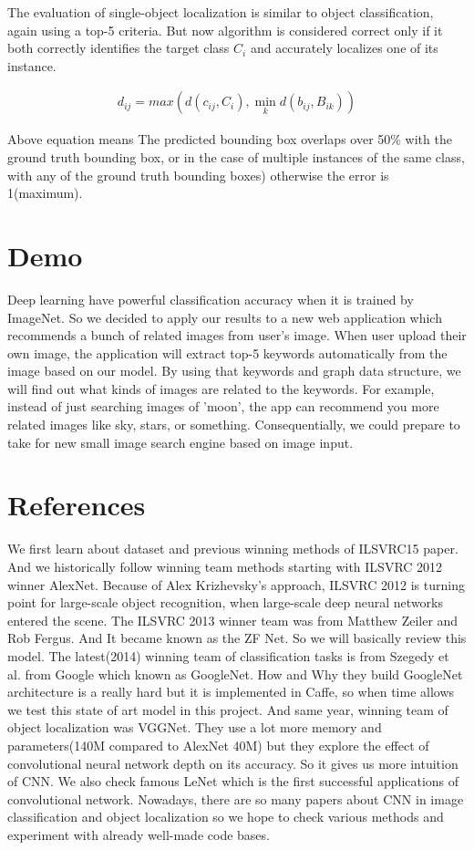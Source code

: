 \documentclass[10pt,twocolumn,letterpaper]{article}
\begin{document}
The evaluation of single-object localization is similar to object classification, again using a top-5 criteria.
But now algorithm is considered correct only if it both correctly identifies the target class $C_i$ and accurately localizes one of its instance.

\begin{align*}
d_{ij} = max(d(c_{ij}, C_{i}), \min_{k}d(b_{ij}, B_{ik}))
\end{align*}

Above equation means The predicted bounding box overlaps over 50\% with the ground truth bounding box, or in the case of multiple instances of the same class, with any of the ground truth bounding boxes) otherwise the error is 1(maximum).

\section{Demo}

Deep learning have powerful classification accuracy when it is trained by ImageNet.
So we decided to apply our results to a new web application which recommends a bunch of related images from user's image.
When user upload their own image, the application will extract top-5 keywords automatically from the image based on our model.
By using that keywords and graph data structure, we will find out what kinds of images are related to the keywords.
For example, instead of just searching images of 'moon', the app can recommend you more related images like sky, stars, or something.
Consequentially, we could prepare to take for new small image search engine based on image input.

\section{References}

We first learn about dataset and previous winning methods of ILSVRC15 paper. \cite{ILSVRC15}
And we historically follow winning team methods starting with ILSVRC 2012 winner AlexNet. \cite{AlexNet}
Because of Alex Krizhevsky's approach, ILSVRC 2012 is turning point for large-scale object recognition, when large-scale deep neural networks entered the scene.
The ILSVRC 2013 winner team was from Matthew Zeiler and Rob Fergus.
And It became known as the ZF Net.\cite{ZFNet} So we will basically review this model.
The latest(2014) winning team of classification tasks is from Szegedy et al. from Google which known as GoogleNet. \cite{GoogleNet}
How and Why they build GoogleNet architecture is a really hard but it is implemented in Caffe, so when time allows we test this state of art model in this project.
And same year, winning team of object localization was VGGNet. \cite{VGGNet}
They use a lot more memory and parameters(140M compared to AlexNet 40M) but they explore the effect of convolutional neural network depth on its accuracy.
So it gives us more intuition of CNN.
We also check famous LeNet \cite{LeNet} which is the first successful applications of convolutional network.
Nowadays, there are so many papers about CNN in image classification and object localization so we hope to check various methods and experiment with already well-made code bases.

{\small


}
\end{document}
